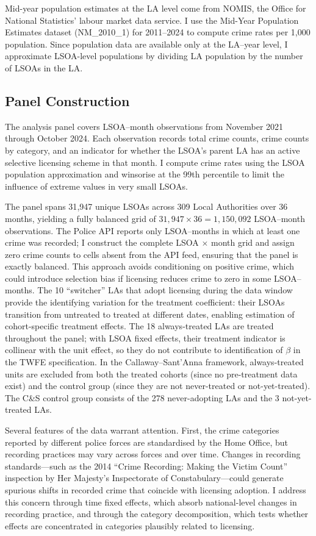 \documentclass[12pt]{article}
\begin{document}
Mid-year population estimates at the LA level come from NOMIS, the Office for National Statistics' labour market data service. I use the Mid-Year Population Estimates dataset (NM\_2010\_1) for 2011--2024 to compute crime rates per 1{,}000 population. Since population data are available only at the LA--year level, I approximate LSOA-level populations by dividing LA population by the number of LSOAs in the LA.

\subsection{Panel Construction}

The analysis panel covers LSOA--month observations from November 2021 through October 2024. Each observation records total crime counts, crime counts by category, and an indicator for whether the LSOA's parent LA has an active selective licensing scheme in that month. I compute crime rates using the LSOA population approximation and winsorise at the 99th percentile to limit the influence of extreme values in very small LSOAs.

The panel spans 31{,}947 unique LSOAs across 309 Local Authorities over 36 months, yielding a fully balanced grid of $31{,}947 \times 36 = 1{,}150{,}092$ LSOA--month observations. The Police API reports only LSOA--months in which at least one crime was recorded; I construct the complete LSOA $\times$ month grid and assign zero crime counts to cells absent from the API feed, ensuring that the panel is exactly balanced. This approach avoids conditioning on positive crime, which could introduce selection bias if licensing reduces crime to zero in some LSOA--months. The 10 ``switcher'' LAs that adopt licensing during the data window provide the identifying variation for the treatment coefficient: their LSOAs transition from untreated to treated at different dates, enabling estimation of cohort-specific treatment effects. The 18 always-treated LAs are treated throughout the panel; with LSOA fixed effects, their treatment indicator is collinear with the unit effect, so they do not contribute to identification of $\beta$ in the TWFE specification. In the Callaway--Sant'Anna framework, always-treated units are excluded from both the treated cohorts (since no pre-treatment data exist) and the control group (since they are not never-treated or not-yet-treated). The C\&S control group consists of the 278 never-adopting LAs and the 3 not-yet-treated LAs.

Several features of the data warrant attention. First, the crime categories reported by different police forces are standardised by the Home Office, but recording practices may vary across forces and over time. Changes in recording standards---such as the 2014 ``Crime Recording: Making the Victim Count'' inspection by Her Majesty's Inspectorate of Constabulary---could generate spurious shifts in recorded crime that coincide with licensing adoption. I address this concern through time fixed effects, which absorb national-level changes in recording practice, and through the category decomposition, which tests whether effects are concentrated in categories plausibly related to licensing.
\end{document}
